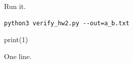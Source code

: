 \documentclass[solutions=false]{akizumi-hw}
\begin{document}
\begin{problem}
Run it.
\begin{solution}
\begin{verbatim}
python3 verify_hw2.py --out=a_b.txt
\end{verbatim}
\begin{codeblock}[lang=python]
print(1)
\end{codeblock}
\end{solution}
\begin{solution} One line. \end{solution}
\end{problem}
\end{document}
